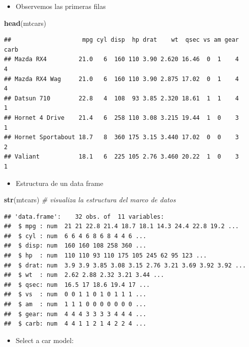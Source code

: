 \documentclass[]{book}
\newenvironment{Shaded}{\begin{snugshade}}{\end{snugshade}}
\newcommand{\KeywordTok}[1]{\textcolor[rgb]{0.13,0.29,0.53}{\textbf{#1}}}
\newcommand{\CommentTok}[1]{\textcolor[rgb]{0.56,0.35,0.01}{\textit{#1}}}
\newcommand{\NormalTok}[1]{#1}
\providecommand{\tightlist}{%
  \setlength{\itemsep}{0pt}\setlength{\parskip}{0pt}}
\begin{document}
\begin{itemize}
\tightlist
\item
  Observemos las primeras filas
\end{itemize}

\begin{Shaded}
\begin{Highlighting}[]
\KeywordTok{head}\NormalTok{(mtcars)}
\end{Highlighting}
\end{Shaded}

\begin{verbatim}
##                    mpg cyl disp  hp drat    wt  qsec vs am gear carb
## Mazda RX4         21.0   6  160 110 3.90 2.620 16.46  0  1    4    4
## Mazda RX4 Wag     21.0   6  160 110 3.90 2.875 17.02  0  1    4    4
## Datsun 710        22.8   4  108  93 3.85 2.320 18.61  1  1    4    1
## Hornet 4 Drive    21.4   6  258 110 3.08 3.215 19.44  1  0    3    1
## Hornet Sportabout 18.7   8  360 175 3.15 3.440 17.02  0  0    3    2
## Valiant           18.1   6  225 105 2.76 3.460 20.22  1  0    3    1
\end{verbatim}

\begin{itemize}
\tightlist
\item
  Estructura de un data frame
\end{itemize}

\begin{Shaded}
\begin{Highlighting}[]
\KeywordTok{str}\NormalTok{(mtcars) }\CommentTok{# visualiza la estructura del marco de datos}
\end{Highlighting}
\end{Shaded}

\begin{verbatim}
## 'data.frame':    32 obs. of  11 variables:
##  $ mpg : num  21 21 22.8 21.4 18.7 18.1 14.3 24.4 22.8 19.2 ...
##  $ cyl : num  6 6 4 6 8 6 8 4 4 6 ...
##  $ disp: num  160 160 108 258 360 ...
##  $ hp  : num  110 110 93 110 175 105 245 62 95 123 ...
##  $ drat: num  3.9 3.9 3.85 3.08 3.15 2.76 3.21 3.69 3.92 3.92 ...
##  $ wt  : num  2.62 2.88 2.32 3.21 3.44 ...
##  $ qsec: num  16.5 17 18.6 19.4 17 ...
##  $ vs  : num  0 0 1 1 0 1 0 1 1 1 ...
##  $ am  : num  1 1 1 0 0 0 0 0 0 0 ...
##  $ gear: num  4 4 4 3 3 3 3 4 4 4 ...
##  $ carb: num  4 4 1 1 2 1 4 2 2 4 ...
\end{verbatim}

\begin{itemize}
\tightlist
\item
  Select a car model:
\end{itemize}
\end{document}

